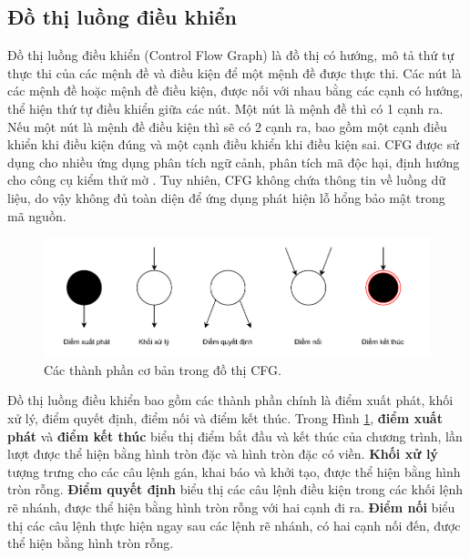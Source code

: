 \subsection{Đồ thị luồng điều khiển}

Đồ thị luồng điều khiển (Control Flow Graph) \cite{yan2019classifying} là đồ thị có hướng, mô tả thứ tự thực thi của các mệnh đề và điều kiện để một mệnh đề được thực thi.
Các nút là các mệnh đề hoặc mệnh đề điều kiện, được nối với nhau bằng các cạnh có hướng, thể hiện thứ tự điều khiển giữa các nút.
Một nút là mệnh đề thì có 1 cạnh ra.
Nếu một nút là mệnh đề điều kiện thì sẽ có 2 cạnh ra, bao gồm một cạnh điều khiển khi điều kiện đúng và một cạnh điều khiển khi điều kiện sai.
CFG được sử dụng cho nhiều ứng dụng phân tích ngữ cảnh, phân tích mã độc hại, định hướng cho công cụ kiểm thử mờ \cite{gascon2013structural}. %
Tuy nhiên, CFG không chứa thông tin về luồng dữ liệu, do vậy không đủ toàn diện để ứng dụng phát hiện lỗ hổng bảo mật trong mã nguồn.

\begin{figure}[H]
  \includegraphics[width=1\columnwidth]{figures/c2/c2_cfg_point.drawio.pdf}
  \centering
  \caption{Các thành phần cơ bản trong đồ thị CFG.}
  \label{img:c2_cfg_point}
\end{figure}

Đồ thị luồng điều khiển bao gồm các thành phần chính là điểm xuất phát, khối xử lý, điểm quyết định, điểm nối và điểm kết thúc.
Trong Hình \ref{img:c2_cfg_point}, \textbf{điểm xuất phát} và \textbf{điểm kết thúc} biểu thị điểm bắt đầu và kết thúc của chương trình, lần lượt được thể hiện bằng hình tròn đặc và hình tròn đặc có viền.
\textbf{Khối xử lý} tượng trưng cho các câu lệnh gán, khai báo và khởi tạo, được thể hiện bằng hình tròn rỗng.
\textbf{Điểm quyết định} biểu thị các câu lệnh điều kiện trong các khối lệnh rẽ nhánh, được thể hiện bằng hình tròn rỗng với hai cạnh đi ra.
\textbf{Điểm nối} biểu thị các câu lệnh thực hiện ngay sau các lệnh rẽ nhánh, có hai cạnh nối đến, được thể hiện bằng hình tròn rỗng.

